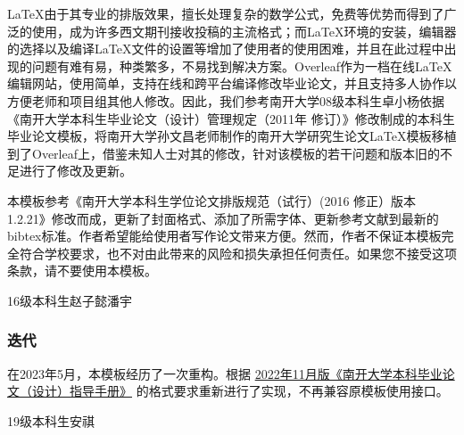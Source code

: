 \LaTeX 由于其专业的排版效果，擅长处理复杂的数学公式，免费等优势而得到了广泛的使用，成为许多西文期刊接收投稿的主流格式；而\LaTeX 环境的安装，编辑器的选择以及编译\LaTeX 文件的设置等增加了使用者的使用困难，并且在此过程中出现的问题有难有易，种类繁多，不易找到解决方案。Overleaf作为一档在线\LaTeX 编辑网站，使用简单，支持在线和跨平台编译修改毕业论文，并且支持多人协作以方便老师和项目组其他人修改。因此，我们参考南开大学08级本科生卓小杨依据《南开大学本科生毕业论文（设计）管理规定（2011年 修订）》修改制成的本科生毕业论文模板，将南开大学孙文昌老师制作的南开大学研究生论文\LaTeX 模板移植到了Overleaf上，借鉴未知人士对其的修改，针对该模板的若干问题和版本旧的不足进行了修改及更新。

本模板参考《南开大学本科生学位论文排版规范（试行）(2016 修正）版本 1.2.21》修改而成，更新了封面格式、添加了所需字体、更新参考文献到最新的bibtex标准。作者希望能给使用者写作论文带来方便。然而，作者不保证本模板完全符合学校要求，也不对由此带来的风险和损失承担任何责任。如果您不接受这项条款，请不要使用本模板。

\hfill 16级本科生\quad 赵子懿\quad 潘宇

\subsubsection{迭代}

在2023年5月，本模板经历了一次重构。根据 \href{http://jwc.nankai.edu.cn/2022/1124/c24a497818/page.htm}{2022年11月版《南开大学本科毕业论文（设计）指导手册》} 的格式要求重新进行了实现，不再兼容原模板使用接口。

\hfill 19级本科生\quad 安祺